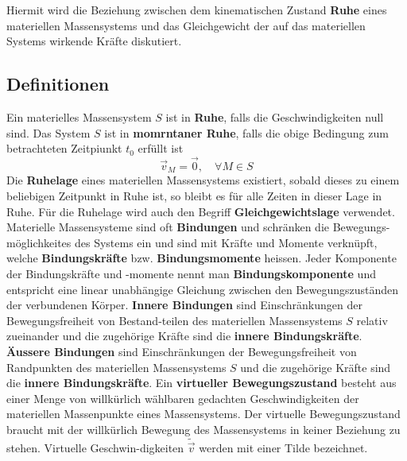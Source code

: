 Hiermit wird die Beziehung zwischen dem kinematischen Zustand \textbf{Ruhe} eines materiellen Massensystems und das Gleichgewicht der auf das materiellen Systems wirkende Kräfte diskutiert.
\subsection{Definitionen}
Ein materielles Massensystem $S$ ist in \textbf{Ruhe}, falls die Geschwindigkeiten null sind. Das System $S$ ist in \textbf{momrntaner Ruhe}, falls die obige Bedingung zum betrachteten Zeitpiunkt $t_0$ erfüllt ist
\begin{equation}
\boxed{\overrightarrow{v}_M=\overrightarrow{0},\quad \forall M\in S}
\end{equation}
Die \textbf{Ruhelage} eines materiellen Massensystems existiert, sobald dieses zu einem beliebigen Zeitpunkt in Ruhe ist, so bleibt es für alle Zeiten in dieser Lage in Ruhe. Für die Ruhelage wird auch den Begriff \textbf{Gleichgewichtslage} verwendet. 
\newline\newline 
Materielle Massensysteme sind oft \textbf{Bindungen} und schränken die Bewegungs-möglichkeites des Systems ein und sind mit Kräfte und Momente verknüpft, welche \textbf{Bindungskräfte} bzw. \textbf{Bindungsmomente} heissen.  Jeder Komponente der Bindungskräfte und -momente nennt man \textbf{Bindungskomponente} und entspricht eine linear unabhängige Gleichung zwischen den Bewegungszuständen der verbundenen Körper.
\newline\newline
\textbf{Innere Bindungen} sind Einschränkungen der Bewegungsfreiheit von Bestand-teilen des materiellen Massensystems $S$ relativ zueinander und die zugehörige Kräfte sind die \textbf{innere Bindungskräfte}.
\newline\newline
\textbf{Äussere Bindungen} sind Einschränkungen der Bewegungsfreiheit von Randpunkten des materiellen Massensystems $S$ und die zugehörige Kräfte sind die \textbf{innere Bindungskräfte}.
\newline\newline
Ein \textbf{virtueller Bewegungszustand} besteht aus einer Menge von willkürlich wählbaren gedachten Geschwindigkeiten der materiellen Massenpunkte eines Massensystems. Der virtuelle Bewegungszustand braucht mit der willkürlich Bewegung des Massensystems in keiner Beziehung zu stehen. Virtuelle Geschwin-digkeiten $\tilde{\overrightarrow{v}}$ werden mit einer Tilde bezeichnet.
